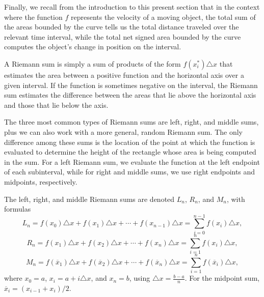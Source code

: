 Finally, we recall from the introduction to this present section that in the context where the function $f$ represents the velocity of a moving object, the total sum of the areas bounded by the curve tells us the total distance traveled over the relevant time interval, while the total net signed area bounded by the curve computes the object's change in position on the interval.




\begin{summary}
\item A Riemann sum is simply a sum of products of the form $f(x_i^*) \triangle x$ that estimates the area between a positive function and the horizontal axis over a given interval.  If the function is sometimes negative on the interval, the Riemann sum estimates the difference between the areas that lie above the horizontal axis and those that lie below the axis.
\item The three most common types of Riemann sums are left, right, and middle sums, plus we can also work with a more general, random Riemann sum.  The only difference among these sums is the location of the point at which the function is evaluated to determine the height of the rectangle whose area is being computed in the sum.  For a left Riemann sum, we evaluate the function at the left endpoint of each subinterval, while for right and middle sums, we use right endpoints and midpoints, respectively.
\item The left, right, and middle Riemann sums are denoted $L_n$, $R_n$, and $M_n$, with formulas
$$L_n = f(x_0) \triangle x + f(x_1) \triangle x + \cdots + f(x_{n-1}) \triangle x = \sum_{i = 0}^{n-1} f(x_i) \triangle x,$$
$$R_n = f(x_1) \triangle x + f(x_2) \triangle x + \cdots + f(x_{n}) \triangle x = \sum_{i = 1}^{n} f(x_i) \triangle x,$$
$$M_n = f(\overline{x}_1) \triangle x + f(\overline{x}_2) \triangle x + \cdots + f(\overline{x}_{n}) \triangle x = \sum_{i = 1}^{n} f(\overline{x}_i) \triangle x,$$
where $x_0 = a$, $x_i = a + i\triangle x$, and $x_n = b$, using $\triangle x = \frac{b-a}{n}$.  For the midpoint sum, $\overline{x}_{i} = (x_{i-1} + x_i)/2$.
\end{summary}

\nin \hrulefill

 

\clearpage
